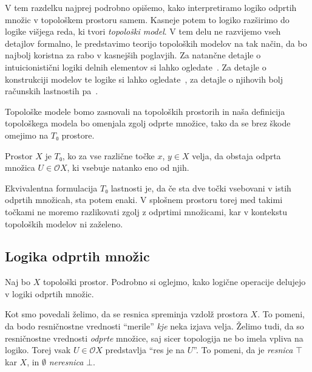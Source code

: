 
V tem razdelku najprej podrobno opišemo, kako interpretiramo logiko odprtih
množic v topološkem prostoru samem. Kasneje potem to logiko razširimo do logike
višjega reda, ki tvori \emph{topološki model}. V tem delu ne razvijemo vseh
detajlov formalno, le predstavimo teorijo topoloških modelov na tak način, da bo
najbolj koristna za rabo v kasnejših poglavjih. Za natančne detajle o
intuicionistični logiki delnih elementov si lahko ogledate~\cite{Scott79}. Za
detajle o konstrukciji modelov te logike si lahko ogledate~\cite{FS79}, za
detajle o njihovih bolj računskih lastnostih pa~\cite[pogl.~2.6-2.8]{Borceux94}.

Topološke modele bomo zasnovali na topoloških prostorih in naša definicija
topološkega modela bo omenjala zgolj odprte množice, tako da se brez škode
omejimo na \(T₀\) prostore.
\begin{definicija}
  Prostor \(X\) je \(T₀\), ko za vse različne točke \(x\), \(y ∈ X\) velja, da
  obstaja odprta množica \(U ∈ 𝒪X\), ki vsebuje natanko eno od njih.
\end{definicija}
Ekvivalentna formulacija \(T₀\) lastnosti je, da če sta dve točki vsebovani
v istih odprtih množicah, sta potem enaki. V splošnem prostoru torej med takimi
točkami ne moremo razlikovati zgolj z odprtimi množicami, kar v kontekstu
topoloških modelov ni zaželeno.


\subsection{Logika odprtih množic}\label{sec:modeli-logika-odprtih}

Naj bo \(X\) topološki prostor. Podrobno si oglejmo, kako logične operacije
delujejo v logiki odprtih množic.

Kot smo povedali želimo, da se resnica spreminja vzdolž prostora \(X\). To
pomeni, da bodo resničnostne vrednosti ``merile'' \emph{kje} neka izjava velja.
Želimo tudi, da so resničnostne vrednosti \emph{odprte} množice, saj sicer
topologija ne bo imela vpliva na logiko. Torej vsak \(U ∈ 𝒪X\) predstavlja ``res
je na \(U\)''. To pomeni, da je \emph{resnica} \(⊤\) kar \(X\), in \(∅\)
\emph{neresnica} \(⊥\).

